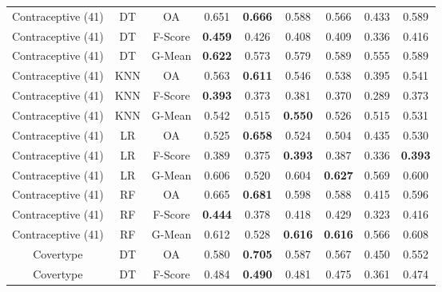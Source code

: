 \begin{longtable}{ccccccccc}
Contraceptive (41) &         DT &      OA &          0.651 & \textbf{0.666} &          0.588 &          0.566 &          0.433 &          0.589 \\
Contraceptive (41) &         DT & F-Score & \textbf{0.459} &          0.426 &          0.408 &          0.409 &          0.336 &          0.416 \\
Contraceptive (41) &         DT &  G-Mean & \textbf{0.622} &          0.573 &          0.579 &          0.589 &          0.555 &          0.589 \\
Contraceptive (41) &        KNN &      OA &          0.563 & \textbf{0.611} &          0.546 &          0.538 &          0.395 &          0.541 \\
Contraceptive (41) &        KNN & F-Score & \textbf{0.393} &          0.373 &          0.381 &          0.370 &          0.289 &          0.373 \\
Contraceptive (41) &        KNN &  G-Mean &          0.542 &          0.515 & \textbf{0.550} &          0.526 &          0.515 &          0.531 \\
Contraceptive (41) &         LR &      OA &          0.525 & \textbf{0.658} &          0.524 &          0.504 &          0.435 &          0.530 \\
Contraceptive (41) &         LR & F-Score &          0.389 &          0.375 & \textbf{0.393} &          0.387 &          0.336 & \textbf{0.393} \\
Contraceptive (41) &         LR &  G-Mean &          0.606 &          0.520 &          0.604 & \textbf{0.627} &          0.569 &          0.600 \\
Contraceptive (41) &         RF &      OA &          0.665 & \textbf{0.681} &          0.598 &          0.588 &          0.415 &          0.596 \\
Contraceptive (41) &         RF & F-Score & \textbf{0.444} &          0.378 &          0.418 &          0.429 &          0.323 &          0.416 \\
Contraceptive (41) &         RF &  G-Mean &          0.612 &          0.528 & \textbf{0.616} & \textbf{0.616} &          0.566 &          0.608 \\
         Covertype &         DT &      OA &          0.580 & \textbf{0.705} &          0.587 &          0.567 &          0.450 &          0.552 \\
         Covertype &         DT & F-Score &          0.484 & \textbf{0.490} &          0.481 &          0.475 &          0.361 &          0.474 \\

\end{longtable}
